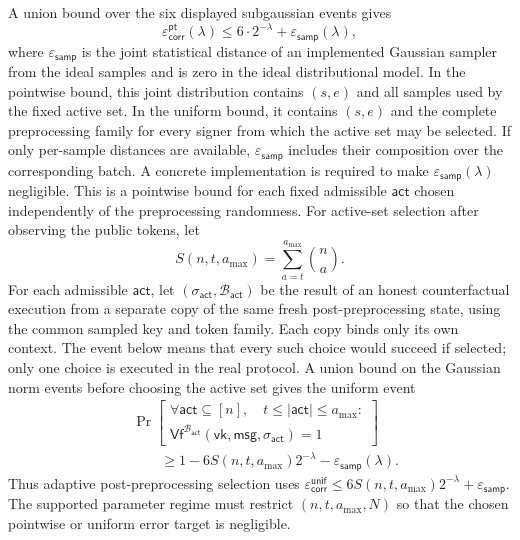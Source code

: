 \documentclass[lettersize,journal]{IEEEtran}
\begin{document}
	A union bound over the six
	displayed subgaussian events gives
	\[
	\varepsilon_{\mathsf{corr}}^{\mathsf{pt}}(\lambda)
	\leq
	6\cdot2^{-\lambda}+\varepsilon_{\mathsf{samp}}(\lambda),
	\]
	where $\varepsilon_{\mathsf{samp}}$ is the joint statistical distance of an
	implemented Gaussian sampler from the ideal samples and is zero in the ideal
	distributional model. In the pointwise bound, this joint distribution contains
	$(s,e)$ and all samples used by the fixed active set. In the uniform bound, it
	contains $(s,e)$ and the complete preprocessing family for every signer from
	which the active set may be selected. If only per-sample distances are
	available, $\varepsilon_{\mathsf{samp}}$ includes their composition over the
	corresponding batch. {A concrete implementation is
		required to make $\varepsilon_{\mathsf{samp}}(\lambda)$ negligible. This is a
		pointwise bound for each fixed admissible $\mathsf{act}$ chosen independently
		of the preprocessing randomness. For active-set selection after observing the
		public tokens, let
		\[
		S(n,t,a_{\max})
		=
		\sum_{a=t}^{a_{\max}}\binom{n}{a}.
		\]
		For each admissible $\mathsf{act}$, let
		$(\sigma_{\mathsf{act}},\mathcal B_{\mathsf{act}})$ be the result of an
		honest counterfactual execution from a separate copy of the same fresh
		post-preprocessing state, using the common sampled key and token family.
		Each copy binds only its own context. The event below means that every
		such choice would succeed if selected; only one choice is executed in the
		real protocol. A union bound on the Gaussian norm events before choosing
		the active set gives the uniform event
		\[
		\begin{aligned}
			&\Pr\!\left[
			\begin{array}{c}
				\forall\mathsf{act}\subseteq[n],\quad
				t\leq|\mathsf{act}|\leq a_{\max}:\\
				\mathsf{Vf}^{\mathcal B_{\mathsf{act}}}
				(\mathsf{vk},\mathsf{msg},\sigma_{\mathsf{act}})=1
			\end{array}
			\right]\\
			&\qquad\geq
			1-6S(n,t,a_{\max})2^{-\lambda}
			-\varepsilon_{\mathsf{samp}}(\lambda).
		\end{aligned}
		\]
		Thus adaptive post-preprocessing selection uses
		$\varepsilon_{\mathsf{corr}}^{\mathsf{unif}}
		\leq6S(n,t,a_{\max})2^{-\lambda}+\varepsilon_{\mathsf{samp}}$.
		The supported parameter regime must restrict $(n,t,a_{\max},N)$ so that the
		chosen pointwise or uniform error target is negligible.}
\end{document}
